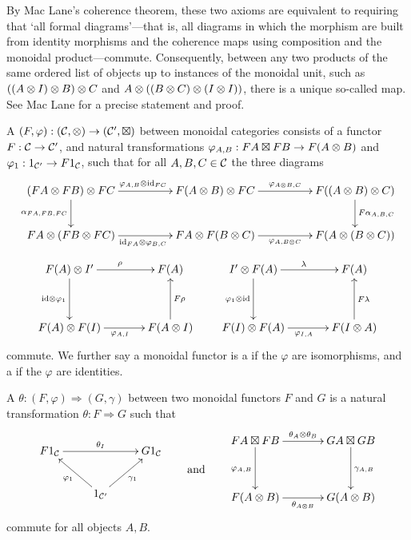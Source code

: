 By Mac Lane's coherence theorem, these two axioms are equivalent to requiring
that `all formal diagrams'---that is, all diagrams in which the morphism are
built from identity morphisms and the coherence maps using composition and the
monoidal product---commute. Consequently, between any two products of the same
ordered list of objects up to instances of the monoidal unit, such as $((A \otimes
I) \otimes B) \otimes C$ and $A \otimes ((B \otimes C) \otimes (I \otimes I))$, there is a unique
so-called  map. See Mac Lane \cite[Corollary of Theorem
VII.2.1]{Mac98} for a precise statement and proof.

A  $(F, \varphi): ({\mathcal{C}},\otimes) \to ({\mathcal{C}}',\boxtimes)$
between monoidal categories consists of a functor $F: {\mathcal{C}} \to {\mathcal{C}}'$, and natural
transformations $\varphi_{A,B}: FA \boxtimes FB \to F(A \otimes B)$ and $\varphi_1:
1_{{\mathcal{C}}'} \to F1_{{\mathcal{C}}}$, such that for all $A,B,C \in {\mathcal{C}}$ the three diagrams
\[
  \xymatrixcolsep{4pc}
  \xymatrix{
    (FA \ot FB) \ot FC \ar[d]_{\a_{FA,FB,FC}} \ar[r]^{\varphi_{A,B} \ot \idn_{FC}} &
    F(A \ot B) \ot FC \ar[r]^{\varphi_{A\ot B,C}} & F((A \ot B) \ot C) \ar[d]^{F\a_{A,B,C}}\\
    FA \ot (FB \ot FC) \ar[r]_{\idn_{FA} \ot \varphi_{B,C}} & FA \ot F(B \ot C)
    \ar[r]_{\varphi_{A,B\ot C}} & F(A \ot (B \ot C))
  }
\]
\[
  \xymatrixcolsep{3pc}
  \xymatrixrowsep{3pc}
  \xymatrix{
    F(A) \ot I' \ar[d]_{\idn \ot \varphi_1} \ar[r]^{\rho} & F(A) \\
    F(A) \ot F(I) \ar[r]_{\varphi_{A,I}} & F(A \ot I) \ar[u]_{F\rho} 
  }
  \qquad
  \xymatrix{
    I' \ot F(A) \ar[d]_{\varphi_1 \ot \idn} \ar[r]^{\lambda} & F(A) \\
    F(I) \ot F(A) \ar[r]_{\varphi_{I,A}} & F(I \ot A) \ar[u]_{F\lambda} 
  }
\]
commute. We further say a monoidal functor is a 
if the $\varphi$ are isomorphisms, and a  if the
$\varphi$ are identities. 

A  $\theta: (F,\varphi) \Rightarrow
(G,\gamma)$ between two monoidal functors $F$ and $G$ is a natural
transformation $\theta: F \Rightarrow G$ such that
\[
  \begin{aligned}
    \xymatrix{
      F1_{\c} \ar[rr]^{\theta_I}&& G1_{\c} \\
      & 1_{\c'} \ar[ul]^{\varphi_1} \ar[ur]_{\gamma_1}
    } 
  \end{aligned} 
  \qquad 
  \mbox{and}
  \qquad
  \begin{aligned}
    \xymatrixcolsep{3pc}
    \xymatrixrowsep{3pc}
    \xymatrix{
      FA \boxtimes FB \ar[r]^{\theta_A \ot \theta_B} \ar[d]_{\varphi_{A,B}} 
      & GA \boxtimes GB \ar[d]^{\gamma_{A,B}}\\
      F(A \ot B) \ar[r]_{\theta_{A\ot B}} & G(A \ot B)
    }
  \end{aligned} 
\]
commute for all objects $A,B$.

